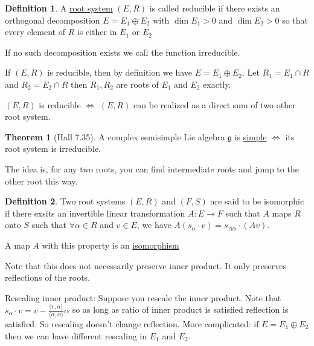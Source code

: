 \documentclass{article}
\theoremstyle{definition}
\newtheorem{definition}{Definition}
\newtheorem{theorem}{Theorem}
\begin{document}
\begin{definition}
    A \underline{root system} \((E,R)\) is called reducible if there exists an orthogonal decomposition \(E = E_1 \oplus E_2\) with \(\dim E_1 >0\) and \(\dim E_2 > 0\) so that every element of \(R\) is either in \(E_1\) or \(E_2\) 

    If no such decomposition exists we call the function irreducible.

\end{definition}

If \((E,R)\) is reducible, then by definition we have \(E = E_1 \oplus E_2\). Let \(R_1 = E_1\cap R\) and \(R_2 = E_2\cap R\) then \(R_1 ,R_2\) are roots of \(E_1\) and \(E_2\) exactly.

\((E,R)\) is reducible \(\iff\) \((E,R)\) can be realized as a direct sum of two other root system.

\begin{theorem}
    [Hall 7.35] A complex semisimple Lie algebra \(\mathfrak{g} \) is \underline{simple} \(\iff \) its root system is irreducible.
\end{theorem}

The idea is, for any two roots, you can find intermediate roots and jump to the other root this way.

\begin{definition}
    Two root systems \((E,R)\) and \((F,S)\) are said to be isomorphic if there exsits an invertible linear transformation \(A: E\to F\) such that \(A\) maps \(R\) onto \(S\) such that \(\forall \alpha \in R\) and \(v\in E\), we have \(A(s_\alpha \cdot v) = s_{A \alpha}\cdot (Av)\).

    A map \(A\) with this property is an \underline{isomorphism}

    Note that this does not necessarily preserve inner product. It only preserves reflections of the roots.

\end{definition}

Rescaling inner product: Suppose you rescale the inner product. Note that \(s_\alpha \cdot v = v - \frac{\langle v,\alpha  \rangle }{\langle \alpha ,\alpha  \rangle} \alpha\) so as long as ratio of inner product is satisfied reflection is satisfied. So rescaling doesn't change reflection. More complicated: if \(E = E_1 \oplus E_2\) then we can have different rescaling in \(E_1\) and \(E_2\). 
\end{document}
